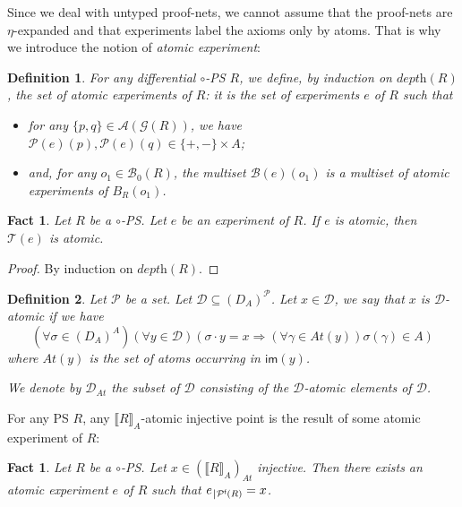 \documentclass{article}
\theoremstyle{plain}
\newtheorem{definition}{Definition}
\newtheorem{fact}[theorem]{Fact}
\newcommand{\atoms}[1]{\textit{At}(#1)}
\newcommand{\groundof}[1]{\mathcal{G}(#1)}
\newcommand{\depthof}[1]{\textit{depth}(#1)}
\def\restriction#1#2{\mathchoice
              {\setbox1\hbox{${\displaystyle #1}_{\scriptstyle #2}$}
              \restrictionaux{#1}{#2}}
              {\setbox1\hbox{${\textstyle #1}_{\scriptstyle #2}$}
              \restrictionaux{#1}{#2}}
              {\setbox1\hbox{${\scriptstyle #1}_{\scriptscriptstyle #2}$}
              \restrictionaux{#1}{#2}}
              {\setbox1\hbox{${\scriptscriptstyle #1}_{\scriptscriptstyle #2}$}
              \restrictionaux{#1}{#2}}}
\def\restrictionaux#1#2{{#1\,\smash{\vrule height .8\ht1 depth .85\dp1}}_{\,#2}}
\newcommand{\im}[1]{\textsf{im}(#1)}
\newcommand{\ports}[1]{\mathcal{P}(#1)}
\newcommand{\conclusions}[1]{\mathcal{P}^{\textsf{f}}(#1)}
\newcommand{\axioms}[1]{\mathcal{A}(#1)}
\newcommand{\sm}[1]{\llbracket #1 \rrbracket}
\newcommand{\boxes}[1]{\mathcal{B}(#1)}
\newcommand{\boxesatzero}[1]{\mathcal{B}_{0}(#1)}
\begin{document}
Since we deal with untyped proof-nets, we cannot assume that the proof-nets are $\eta$-expanded and that experiments label the axioms only by atoms. That is why we introduce the notion of \emph{atomic experiment}:

\begin{definition}
For any differential $\circ$-PS $R$, we define, by induction on $\depthof{R}$, the set of \emph{atomic experiments of $R$}: it is the set of experiments $e$ of $R$ such that
\begin{itemize}
\item for any $\{ p, q \} \in \axioms{\groundof{R}}$, we have $\ports{e}(p), \ports{e}(q) \in \{ +, - \} \times A$;
\item and, for any $o_1 \in \boxesatzero{R}$, the multiset $\boxes{e}(o_1)$ is a multiset of atomic experiments of $B_R(o_1)$.
\end{itemize}
\end{definition}

\begin{fact}\label{fact: an experiment of a flat-pS induces an experiment of differential flat-PS}
Let $R$ be a $\circ$-PS. Let $e$ be an experiment of $R$. If $e$ is atomic, then $\mathcal{T}(e)$ is atomic.
\end{fact}

\begin{proof}
By induction on $\depthof{R}$.
\end{proof}

\begin{definition}
Let $\mathcal{P}$ be a set. Let $\mathcal{D} \subseteq {(D_A)}^\mathcal{P}$. 
Let $x \in \mathcal{D}$, we say that $x$ is \emph{$\mathcal{D}$-atomic} if we have 
$$(\forall \sigma \in {(D_A)}^A) (\forall y \in \mathcal{D}) (\sigma \cdot y = x \Rightarrow (\forall \gamma \in \atoms{y}) \sigma(\gamma) \in A)$$
where $\atoms{y}$ is the set of atoms occurring in $\im{y}$.

We denote by $\mathcal{D}_\textit{At}$ the subset of $\mathcal{D}$ consisting of the $\mathcal{D}$-atomic elements of $\mathcal{D}$.
\end{definition}

For any PS $R$, any $\sm{R}_A$-atomic injective point is the result of some atomic experiment of $R$:

\begin{fact}\label{fact: from point to experiment}
Let $R$ be a $\circ$-PS. Let $x \in {(\sm{R}_A)}_{\textit{At}}$ injective. Then there exists an atomic experiment $e$ of $R$ such that $\restriction{e}{\conclusions{R}} = x$.
\end{fact}
\end{document}
